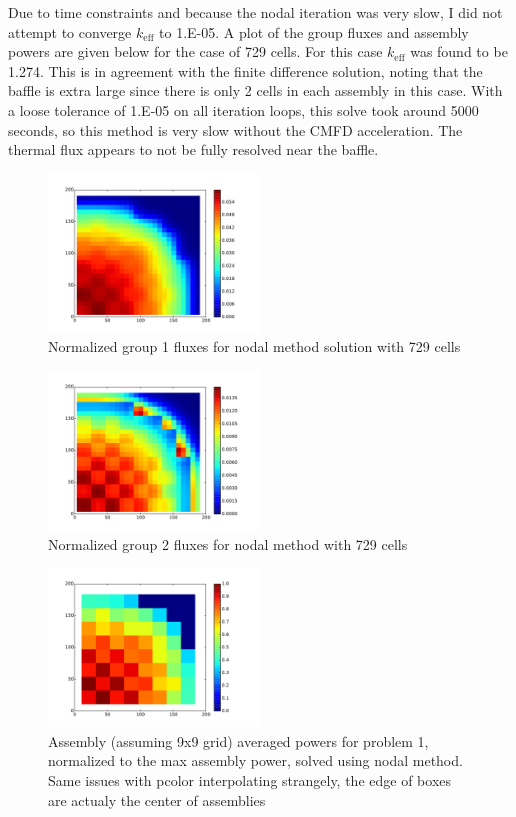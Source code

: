 \documentclass[12pt]{article}
\newcommand{\keff}{\ensuremath{k_{\mathrm{eff}}}}
\newenvironment{solnum}[2][Solution]{\begin{trivlist}
\item[\hskip \labelsep {\bfseries #1}\hskip \labelsep {\bfseries #2:}]\hspace{0.3in}\newline\newline}{\end{trivlist}}
\begin{document}
\begin{solnum}{1-2}
Due to time constraints and because the nodal iteration was very slow, I did not
attempt to converge $\keff$ to 1.E-05.  A plot of the group fluxes and assembly powers are
given below for the case of 729 cells.  For this case $\keff$ was found to be
1.274.  This is in agreement with the finite difference solution, noting that the baffle is extra
large since there is only 2 cells in each assembly in this case.  With a loose tolerance of 1.E-05 on all iteration loops, this solve took
around 5000 seconds, so this method is very slow without the CMFD acceleration. The thermal
flux appears to not be fully resolved near the baffle.
\begin{figure}
    \centering
    \caption{Normalized group 1 fluxes for nodal method solution with 729 cells}
    \includegraphics[width=0.5\textwidth]{prob1_g1_nodal.pdf}
\end{figure}

\begin{figure}
    \centering
    \caption{Normalized group 2 fluxes for nodal method with 729 cells}
    \includegraphics[width=0.5\textwidth]{prob1_g2_nodal.pdf}
\end{figure}

\begin{figure}
    \centering
    \caption{Assembly (assuming 9x9 grid) averaged powers for problem 1, normalized
    to the max assembly power, solved using nodal method. Same issues with pcolor interpolating strangely, the edge of boxes are actualy the center of assemblies}
    \includegraphics[width=0.5\textwidth]{powers_nodal.pdf}
\end{figure}



\end{solnum}
\end{document}

